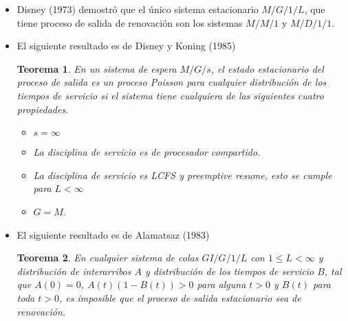 \documentclass{article}
\newtheorem{Teo}{Teorema}
\begin{document}
\begin{itemize}
\item Disney (1973) demostr\'o que el \'unico sistema estacionario $M/G/1/L$, que tiene proceso de salida de renovaci\'on  son los sistemas $M/M/1$ y $M/D/1/1$.



\item El siguiente resultado es de Disney y Koning (1985)
\begin{Teo}
En un sistema de espera $M/G/s$, el estado estacionario del proceso de salida es un proceso Poisson para cualquier distribuci\'on de los tiempos de servicio si el sistema tiene cualquiera de las siguientes cuatro propiedades.

\begin{itemize}
\item[a)] $s=\infty$
\item[b)] La disciplina de servicio es de procesador compartido.
\item[c)] La disciplina de servicio es LCFS y preemptive resume, esto se cumple para $L<\infty$
\item[d)] $G=M$.
\end{itemize}

\end{Teo}

\item El siguiente resultado es de Alamatsaz (1983)

\begin{Teo}
En cualquier sistema de colas $GI/G/1/L$ con $1\leq L<\infty$ y distribuci\'on de interarribos $A$ y distribuci\'on de los tiempos de servicio $B$, tal que $A\left(0\right)=0$, $A\left(t\right)\left(1-B\left(t\right)\right)>0$ para alguna $t>0$ y $B\left(t\right)$ para toda $t>0$, es imposible que el proceso de salida estacionario sea de renovaci\'on.
\end{Teo}

\end{itemize}



\end{document}
